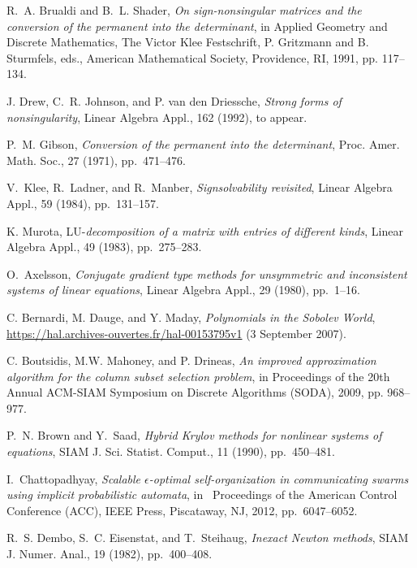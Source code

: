 \documentclass[final,leqno,onetabnum]{siamltex0315}
\begin{document}
 
\begin{thebibliography}{10} 
 {\sc R.~A. Brualdi and B.~L. Shader}, 
{\em On sign-nonsingular matrices and the conversion of the
permanent into the determinant}, in Applied Geometry and
Discrete Mathematics, The Victor Klee Festschrift, P.
Gritzmann and B. Sturmfels, eds., American Mathematical
Society, Providence, RI, 1991, pp. 117--134.
 
 {\sc J. Drew, C.~R. Johnson, and P. van den Driessche}, 
{\em Strong forms of nonsingularity}, Linear Algebra Appl.,
162 (1992), to appear. 
 
 {\sc P.~M. Gibson}, {\em Conversion of the permanent into the 
determinant}, Proc. Amer. Math. Soc., 27 (1971),
pp.~471--476.
 
{\sc V.~Klee, R.~Ladner, and R.~Manber}, {\it
Signsolvability revisited}, Linear Algebra Appl., 59
(1984), pp.~131--157.
 
{\sc K. Murota}, LU-{\em decomposition of a matrix with
entries of different kinds}, Linear Algebra Appl., 49
(1983), pp.~275--283.

{\sc O.~Axelsson}, {\em Conjugate gradient type methods for unsymmetric and
  inconsistent systems of linear equations}, Linear Algebra Appl., 29 (1980),
  pp.~1--16.
  
{\sc C. Bernardi, M. Dauge, and Y. Maday}, {\em Polynomials in the Sobolev
World}, \href{https://hal.archives-ouvertes.fr/hal-00153795v1}{https://hal.archives-ouvertes.fr/hal-00153795v1} (3 September 2007).

{\sc C. Boutsidis, M.W. Mahoney, and P. Drineas},
 {\em An improved approximation algorithm for the column subset selection problem},
 in Proceedings of the 20th Annual ACM-SIAM Symposium on Discrete Algorithms (SODA), 2009, pp. 968--977.

{\sc P.~N. Brown and Y.~Saad}, {\em Hybrid {K}rylov methods for nonlinear
  systems of equations}, SIAM J. Sci. Statist. Comput., 11 (1990), 
  pp.~450--481.
  
{\sc I.~Chattopadhyay}, {\em Scalable $\epsilon$-optimal self-organization in
  communicating swarms using implicit probabilistic automata}, in \ Proceedings of the American
  Control Conference (ACC), IEEE Press, Piscataway, NJ, 2012, pp.~6047--6052.

{\sc R.~S. Dembo, S.~C. Eisenstat, and T.~Steihaug}, {\em Inexact {N}ewton
  methods}, SIAM J. Numer. Anal., 19 (1982), pp.~400--408.


\end{thebibliography}
\end{document}
